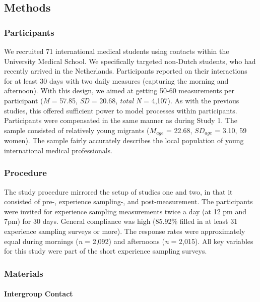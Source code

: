 \subsection{Methods}

\subsubsection{Participants}

We recruited 71 international medical students using contacts within the
University Medical School. We specifically targeted non-Dutch students,
who had recently arrived in the Netherlands. Participants reported on
their interactions for at least 30 days with two daily measures
(capturing the morning and afternoon). With this design, we aimed at
getting 50-60 measurements per participant (\textit{M} = 57.85,
\textit{SD} = 20.68, \textit{total N} = 4,107). As with the previous
studies, this offered sufficient power to model processes within
participants. Participants were compensated in the same manner as during
Study 1. The sample consisted of relatively young migrants (\(M_{age}\)
= 22.68, \(SD_{age}\) = 3.10, 59 women). The sample fairly accurately
describes the local population of young international medical
professionals.

\subsubsection{Procedure}

The study procedure mirrored the setup of studies one and two, in that
it consisted of pre-, experience sampling-, and post-measurement. The
participants were invited for experience sampling measurements twice a
day (at 12 pm and 7pm) for 30 days. General compliance was high (85.92\%
filled in at least 31 experience sampling surveys or more). The response
rates were approximately equal during mornings (\textit{n} = 2,092) and
afternoons (\textit{n} = 2,015). All key variables for this study were
part of the short experience sampling surveys.

\subsubsection{Materials}

\paragraph{Intergroup Contact}


